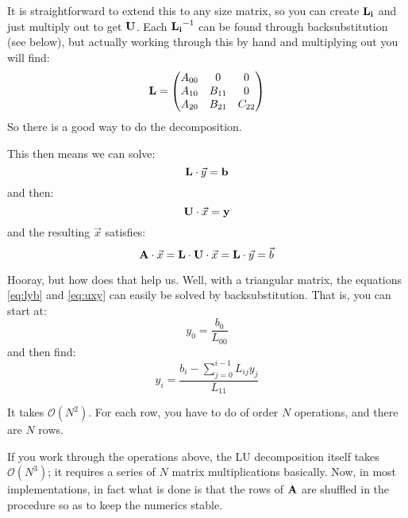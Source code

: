 It is straightforward to extend this to any size matrix, so you can
create ${\bf L_i}$ and just multiply out to get ${\bf U}$. Each
${\bf L_i}^{-1}$ can be found through backsubstitution (see below),
but actually working through this by hand and multiplying out you will find: 
\begin{equation}
{\bf L} = 
\left(
\begin{matrix}
A_{00} & 0 & 0 \cr
A_{10} & B_{11} & 0 \cr
A_{20} & B_{21} & C_{22} \cr
\end{matrix}
\right)
\end{equation}
So there is a good way to do the decomposition.

This then means we can solve:
\begin{equation}
\label{eq:lyb}
{\bf L} \cdot \vec{y} = {\bf b}
\end{equation}
and then:
\begin{equation}
\label{eq:uxy}
{\bf U} \cdot \vec{x} = {\bf y}
\end{equation}
and the resulting $\vec{x}$ satisfies:
\begin{equation}
{\bf A} \cdot \vec{x} = {\bf L} \cdot {\bf U} \cdot \vec{x}  = {\bf L}
\cdot \vec{y} = \vec{b}
\end{equation}

Hooray, but how does that help us. Well, with a triangular matrix, the
equations \ref{eq:lyb} and \ref{eq:uxy} can easily be solved by
backsubstitution.  That is, you can start at:
\begin{equation}
y_0 = \frac{b_0}{L_{00}}
\end{equation}
and then find:
\begin{equation}
y_i = \frac{b_i - \sum_{j=0}^{i-1} L_{ij} y_j}{L_{11}}
\end{equation}


\begin{answer}
It takes $\mathcal{O}(N^2)$. For each row, you have to do of order $N$
operations, and there are $N$ rows. 
\end{answer}

If you work through the operations above, the LU decomposition itself
takes $\mathcal{O}(N^3)$; it requires a series of $N$ matrix
multiplications basically. Now, in most implementations, in fact what
is done is that the rows of ${\bf A}$ are shuffled in the procedure so
as to keep the numerics stable.

